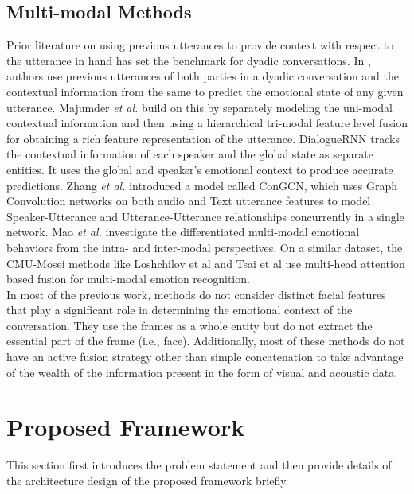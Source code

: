 \documentclass[10pt,twocolumn,letterpaper]{article}
\begin{document}
\subsection{Multi-modal Methods}
Prior literature on using previous utterances to provide context with respect to the utterance in hand has set the benchmark for dyadic conversations. In \cite{hazarika2018conversational, poria-etal-2017-context}, authors use previous utterances of both parties in a dyadic conversation and the contextual information from the same to predict the emotional state of any given utterance. Majumder \textit{et al.} \cite{majumder2018multimodal} build on this by separately modeling the uni-modal contextual information and then using a hierarchical tri-modal feature level fusion for obtaining a rich feature representation of the utterance. DialogueRNN \cite{DBLP:journals/corr/abs-1811-00405} tracks the contextual information of each speaker and the global state as separate entities. It uses the global and speaker's emotional context to produce accurate predictions. Zhang \textit{et al.} \cite{ijcai2019-752} introduced a model called ConGCN, which uses Graph Convolution networks on both audio and Text utterance features to model Speaker-Utterance and Utterance-Utterance relationships concurrently in a single network. Mao \textit{et al.} \cite{mao2020dialoguetrm} investigate the differentiated multi-modal emotional behaviors from the intra- and inter-modal perspectives. On a similar dataset, the CMU-Mosei methods like Loshchilov et al \cite{DBLP:journals/corr/abs-2006-15955} and Tsai et al \cite{tsai2019multimodal} use multi-head attention based fusion \cite{transformer} for multi-modal emotion recognition. \\

In most of the previous work, methods do not consider distinct facial features that play a significant role in determining the emotional context of the conversation. They use the frames as a whole entity but do not extract the essential part of the frame (i.e., face). Additionally, most of these methods do not have an active fusion strategy other than simple concatenation to take advantage of the wealth of the information present in the form of visual and acoustic data.

\section{Proposed Framework}
This section first introduces the problem statement and then provide details of the architecture design of the proposed framework briefly.
\end{document}
